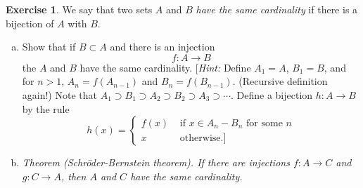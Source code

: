 \documentclass[11pt,a4paper,twoside]{article}
\theoremstyle{definition}
\newcounter{excounter}
\newtheorem{exercise}[excounter]{Exercise}
\begin{document}
\begin{exercise}

  We say that two sets $A$ and $B$ \emph{have the same cardinality} if there is a bijection of $A$ with $B$.

  \begin{enumerate}[(a)]

  \item Show that if $B \subset A$ and there is an injection
    \begin{equation*}
      f : A \to B
    \end{equation*}
    the $A$ and $B$ have the same cardinality. [\emph{Hint:} Define $A_1 = A$, $B_1 = B$,
      and for $n > 1$, $A_n = f (A_{n - 1})$ and $B_n = f (B_{n - 1})$. (Recursive definition again!)
      Note that $A_1 \supset B_1 \supset A_2 \supset B_2 \supset A_3 \supset \dotsb$. Define a bijection
      $h : A \to B$ by the rule
      \begin{equation*}
        h (x) = \begin{cases}
          f (x) &\text{ if } x \in A_n - B_n \text{ for some } n \\
          x &\text{ otherwise.] }
        \end{cases}
      \end{equation*}

    \item \emph{Theorem (Schr\"oder-Bernstein theorem). \quad If there are injections $f : A \to C$ and $g : C \to A$,
    then $A$ and $C$ have the same cardinality.}

  \end{enumerate}

\end{exercise}
\end{document}
